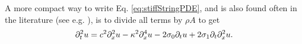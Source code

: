 A more compact way to write Eq. \eqref{eq:stiffStringPDE}, and is also found often in the literature (see e.g. \cite{theBible,Webb2015, Bilbao2019}), is to divide all terms by $\rho A$ to get
\begin{equation}\label{eq:stiffStringPDECompact}
    \partial_t^2 u = c^2 \partial_x^2 u - \kappa^2 \partial_x^4 u - 2 \sigma_{0} \partial_t u + 2 \sigma_{1} \partial_t \partial_x^2 u.
\end{equation} 



